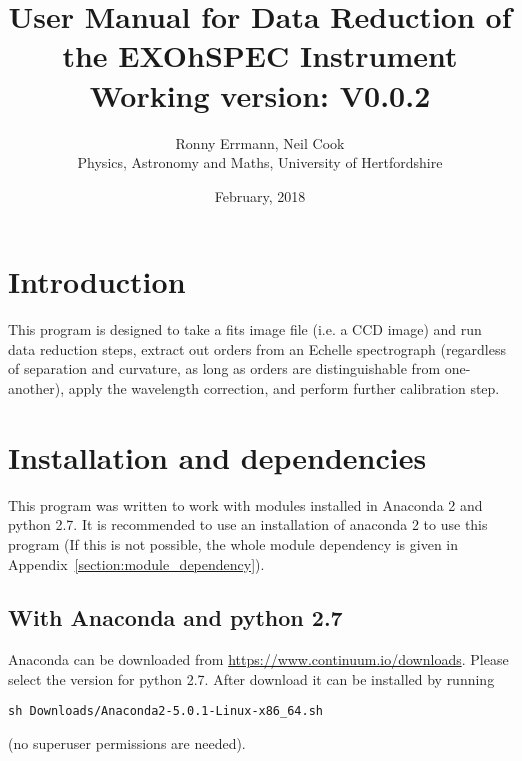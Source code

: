 \documentclass[10pt,a4paper]{article}
\title{User Manual for Data Reduction of the EXOhSPEC Instrument \\ Working version: V0.0.2}
\date{February, 2018}
\author{Ronny Errmann, Neil Cook\\ Physics, Astronomy and Maths, University of Hertfordshire}
\begin{document}
\maketitle

\tableofcontents
{}




\section{Introduction}
\label{intro}




This program is designed to take a fits image file (i.e. a CCD image) and run data reduction steps, extract out orders from an Echelle spectrograph (regardless of separation and curvature, as long as orders are distinguishable from one-another), apply the wavelength correction, and perform further calibration step. 



\newpage
\section{Installation and dependencies}
\label{installation}

\noindent This program was written to work with modules installed in Anaconda 2 and python 2.7. It is recommended to use an installation of anaconda 2 to use this program (If this is not possible, the whole module dependency is given in Appendix~\ref{section:module_dependency}).


\subsection{With Anaconda and python 2.7}

\noindent Anaconda can be downloaded from \url{https://www.continuum.io/downloads}. Please select the version for python 2.7. After download it can be installed by running
\begin{lstlisting}[style=base]
sh Downloads/Anaconda2-5.0.1-Linux-x86_64.sh
\end{lstlisting}
(no superuser permissions are needed).
\end{document}
